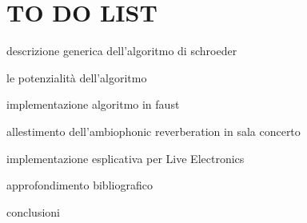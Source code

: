 \newcommand{\mylanguages}{italian,english} %
\newcommand{\mytitle}{Ambiophonic Reverberation}
\newcommand{\mysubtitle}{For a more accessible and less technical introduction
                         to this topic, \\ see Introduction to General Relativity}
\newcommand{\authorone}{Paradisi Francesco}
\newcommand{\institutione}{Conservatorio S. Cecilia di Roma}
\newcommand{\emailone}{francesco.paradisi10@ gmail.com}
\newcommand{\authortwo}{Giuseppe Silvi}
\newcommand{\institutiontwo}{Conservatorio Nicolini di Bari}
\newcommand{\emailtwo}{silvi.giuseppe @ docenticonsba.it} %
\newcommand{\authorthree}{Edoardo Staffa}
\newcommand{\institutionthree}{Conservatorio S. Cecilia di Roma}
\newcommand{\emailthree}{edoardo.staffa1 @ gmail.com} %


\maketitle
\thispagestyle{empty}

\section*{TO DO LIST}

\begin{compactitem}
\item descrizione generica dell'algoritmo di schroeder
\item le potenzialità dell'algoritmo
\item implementazione algoritmo in faust
\item allestimento dell'ambiophonic reverberation in sala concerto
\item implementazione esplicativa per Live Electronics
\item approfondimento bibliografico
\item conclusioni
\item
\item
\end{compactitem}


